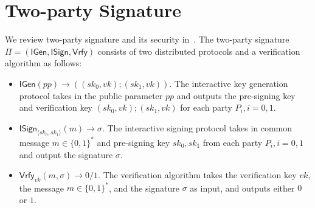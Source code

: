 \documentclass{llncs}
\begin{document}
\begin{center}
\end{center}

\section{Two-party Signature}

We review two-party signature and its security in~\cite{Lin17,CCLST19}. The two-party signature $\Pi=(\mathsf{IGen},\mathsf{ISign},\mathsf{Vrfy})$ consists of two distributed protocols and a verification algorithm as follows:

\begin{itemize}
\item $\mathsf{IGen}(pp)\rightarrow ((sk_0,vk);(sk_1,vk))$. The interactive key generation protocol takes in the public parameter $pp$ and outputs the pre-signing key and verification key $(sk_0,vk);(sk_1,vk)$ for each party $P_i,i=0,1$.

\item $\mathsf{ISign}_{\langle sk_0, sk_1\rangle}(m) \rightarrow \sigma$. The interactive signing protocol takes in common message $m\in\{0,1\}^*$ and pre-signing key $sk_0,sk_1$ from each party $P_i,i=0,1$ and output the signature $\sigma$.

\item $\mathsf{Vrfy}_{vk}(m,\sigma)\rightarrow 0/1$. The verification algorithm takes the verification key $vk$, the message $m\in\{0,1\}^*$, and the signature $\sigma$ as input, and outputs either $0$ or $1$.
\end{itemize}
\end{document}
